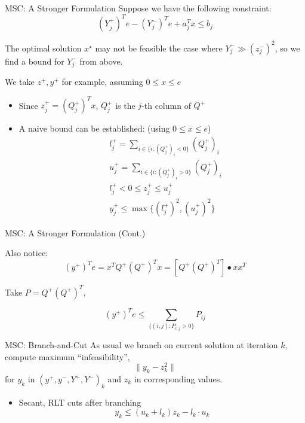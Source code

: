 \begin{frame}{MSC: A Stronger Formulation}
  Suppose we have the following constraint:
  \[(Y^+_j)^Te - (Y^-_j)^Te + a_j^Tx \le b_j\]

  The optimal solution \(x^\star\) may not be feasible the case where \(Y^-_j \gg (z^-_j)^2\),
  so we find a bound for \(Y^-_j\) from above.


  We take \(z^+, y^+\) for example, assuming \(0\le x\le e\)
  \begin{itemize}
    \item Since \(z^+_j = (Q^+_j)^T x\), \(Q^+_j\) is the \(j\)-th column of \(Q^+\)
    \item A naive bound can be established: (using \(0 \le x \le e\))
          \[\begin{aligned}
               & l^+_j = \sum_{i\in\{i: (Q^+_j)_i < 0\}} (Q^+_j)_i \\
               & u^+_j = \sum_{i\in\{i: (Q^+_j)_i > 0\}} (Q^+_j)_i \\
               & l^+_j < 0 \le z^+_j \le  u^+_j                    \\
               & y^+_j \le \max \{(l^+_j)^2, (u^+_j)^2\}
            \end{aligned}
          \]
  \end{itemize}

\end{frame}

\begin{frame}{MSC: A Stronger Formulation (Cont.)}

  Also notice:
  \[ (y^+)^T e = x^TQ^+(Q^+)^Tx = \left[Q^+(Q^+)^T\right]\bullet xx^T
  \]

  Take \(P = Q^+(Q^+)^T\),

  \[(y^+)^T e \le \sum_{\{(i,j): P_{i,j} > 0 \}} P_{ij} \]
\end{frame}


\begin{frame}{MSC: Branch-and-Cut}
  As usual we branch on current solution at iteration \(k\), compute maximum ``infeasibility'',
  \[ \|y_k - z_k^2\|\]
  for \(y_k\) in \((y^+, y^-, Y^+, Y^-)_k\) and \(z_k\) in corresponding values.
  \begin{itemize}
    \item Secant, RLT cuts after branching
          \[y_k \le (u_k + l_k) z_k - l_k \cdot u_k\]

  \end{itemize}
\end{frame}



